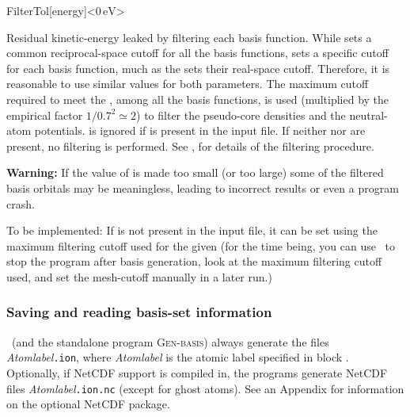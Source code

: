 \begin{fdfentry}{FilterTol}[energy]<$0\,\mathrm{eV}$>

  Residual kinetic-energy leaked by filtering each basis function.
  While  sets a common reciprocal-space cutoff for
  all the basis functions,  sets a specific cutoff for
  each basis function, much as the  sets their
  real-space cutoff. Therefore, it is reasonable to use similar values
  for both parameters.  The maximum cutoff required to meet the
  , among all the basis functions, is used (multiplied
  by the empirical factor $1/0.7^2 \simeq 2$) to filter the
  pseudo-core densities and the neutral-atom
  potentials.  is ignored if  is
  present in the input file.  If neither  nor
   are present, no filtering is performed.  See
  \citeauthor{SOLER20091134}\cite{SOLER20091134}, for details of the
  filtering procedure.

  \textbf{Warning:} If the value of  is made too
  small (or  too large) some of the filtered basis
  orbitals may be meaningless, leading to incorrect results or even a
  program crash.

  To be implemented: If  is not present in the
  input file, it can be set using the maximum filtering cutoff used
  for the given  (for the time being, you can use
   \fdftrue\ to stop the program after basis generation,
  look at the maximum filtering cutoff used, and set the mesh-cutoff
  manually in a later run.)

\end{fdfentry}



\subsubsection{Saving and reading basis-set information}

\siesta\ (and the standalone program \textsc{Gen-basis})
always generate the files
\textit{Atomlabel}\texttt{.ion}, where \textit{Atomlabel} is the atomic label
specified in block .  Optionally, if
NetCDF support is compiled in, the programs generate
NetCDF files 
\textit{Atomlabel}\texttt{.ion.nc} (except for ghost atoms).
See an Appendix for information on the optional NetCDF package.

